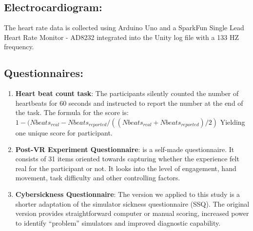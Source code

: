 \documentclass{article}
\begin{document}
\subsection{Electrocardiogram:}  The heart rate data is collected using Arduino Uno and a SparkFun Single Lead Heart Rate Monitor - AD8232 integrated into the Unity log file with a 133 HZ frequency.  
\subsection{Questionnaires:} 
\begin{enumerate}
    \item \textbf{Heart beat count task}: The participants silently counted the number of heartbeats for 60 seconds and instructed to report the number at the end of the task. The formula for the score is: \ $ 1 - (Nbeats_{real}-Nbeats_{reported}/((Nbeats_{real}+Nbeats_{reported})/2)$  Yielding one unique score for participant\citep{GARFINKEL201565}.
    \item \textbf{Post-VR Experiment Questionnaire}: is a self-made questionnaire. It consists of 31 items oriented towards capturing whether the experience felt real for the participant or not. It looks into the level of engagement, hand movement, task difficulty and other controlling factors. 
    \item \textbf{Cybersickness Questionnaire}: The version we applied to this study is a shorter adaptation of the simulator sickness questionnaire (SSQ)\citep{SSQ93}. The original version provides straightforward computer or manual scoring, increased power to identify ``problem'' simulators and improved diagnostic capability.
\end{enumerate}
\end{document}
